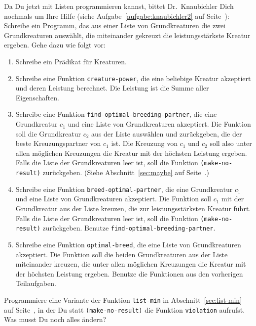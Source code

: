 \begin{aufgabe}
  Da Du jetzt mit Listen programmieren kannst, bittet Dr.~Knaubichler
  Dich nochmals um Ihre Hilfe (siehe Aufgabe~\ref{aufgabe:knaubichler2}
  auf Seite~\pageref{aufgabe:knaubichler2}):
  Schreibe ein Programm, das aus einer Liste von Grundkreaturen
  die zwei Grundkreaturen auswählt, die miteinander gekreuzt die
  leistungsstärkste Kreatur ergeben.
  Gehe dazu wie folgt vor:

  \begin{enumerate}
  \item Schreibe ein Prädikat für Kreaturen.

  \item Schreibe eine Funktion
    \lstinline{creature-power}, die eine beliebige Kreatur akzeptiert und
    deren Leistung berechnet.  Die Leistung ist die Summe aller
    Eigenschaften.

  \item  Schreibe eine Funktion
    \lstinline{find-optimal-breeding-partner}, die eine Grundkreatur
    $c_1$ und eine Liste von Grundkreaturen akzeptiert.  Die Funktion
    soll die Grundkreatur $c_2$ aus der Liste auswählen und
    zurückgeben, die der beste Kreuzungspartner von $c_1$ ist.  Die
    Kreuzung von $c_1$ und $c_2$ soll also unter allen möglichen
    Kreuzungen die Kreatur mit der höchsten Leistung ergeben.  Falls
    die Liste der Grundkreaturen leer ist, soll die Funktion
    \lstinline{(make-no-result)} 
    zurückgeben.  (Siehe
    Abschnitt~\ref{sec:maybe} auf Seite~\pageref{sec:maybe}.)
    
  \item  Schreibe eine Funktion
    \lstinline{breed-optimal-partner}, die eine Grundkreatur $c_1$ und
    eine Liste von Grundkreaturen akzeptiert.  Die Funktion soll $c_1$
    mit der Grundkreatur aus der Liste kreuzen, die zur
    leistungsstärksten Kreatur führt.  Falls die Liste der
    Grundkreaturen leer ist, soll die Funktion \lstinline{(make-no-result)} zurückgeben.
    Benutze \lstinline{find-optimal-breeding-partner}.

  \item  Schreibe eine Funktion
    \lstinline{optimal-breed}, die eine Liste von Grundkreaturen
    akzeptiert.  Die Funktion soll die beiden Grundkreaturen aus der
    Liste miteinander kreuzen, die unter allen möglichen Kreuzungen
    die Kreatur mit der höchsten Leistung ergeben.  Benutze die
    Funktionen aus den vorherigen Teilaufgaben.

  \end{enumerate}
\end{aufgabe}

\begin{aufgabe}\label{aufgabe:list-min-violation}
  Programmiere eine Variante der Funktion \lstinline{list-min} in
  Abschnitt~\ref{sec:list-min} auf Seite~\pageref{sec:list-min}, in
  der Du statt \lstinline{(make-no-result)} die Funktion
  \lstinline{violation} aufrufst.  Was musst Du noch alles ändern?
\end{aufgabe}
